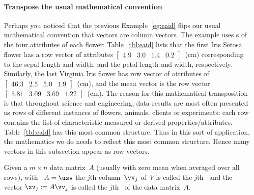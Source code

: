 \paragraph{Transpose the usual mathematical convention}
Perhaps you noticed that the previous Example~\ref{eg:eaid} flips our usual mathematical convention that vectors are column vectors.
The example uses s of the four attributes of each flower: 
Table~\ref{tbl:eaid} lists that the first Iris Setosa flower has a row vector of attributes \(\begin{bmatrix} 4.9&3.0&1.4&0.2 \end{bmatrix}\)~(cm) corresponding to the sepal length and width, and the petal length and width, respectively.
Similarly, the last Virginia Iris flower has row vector of attributes of \(\begin{bmatrix} 46.3&2.5&5.0&1.9 \end{bmatrix}\)~(cm), and the mean vector is the row vector \(\begin{bmatrix} 5.81&3.09&3.69&1.22 \end{bmatrix}\)~(cm).
The reason for this mathematical transposition is that throughout science and engineering, data results are most often presented as rows of different instances of flowers, animals, clients or experiments: each row contains the list of characteristic measured or derived properties\slash attributes.
Table~\ref{tbl:eaid} has this most common structure.
Thus in this sort of application, the mathematics we do needs to reflect this most common structure.
Hence many vectors in this subsection appear as row vectors.




\begin{definition} \label{def:}
Given a \(m\times n\) data matrix~\(A\) (usually with zero mean when averaged over all rows),  with  \svd\ \(A=\usv\) the \(j\)th column~\(\vv_j\) of~\(V\) is called the \(j\)th~ and the vector \(\xv_j:=A\vv_j\) is called the \(j\)th~ of the data matrix~\(A\).
\end{definition}



